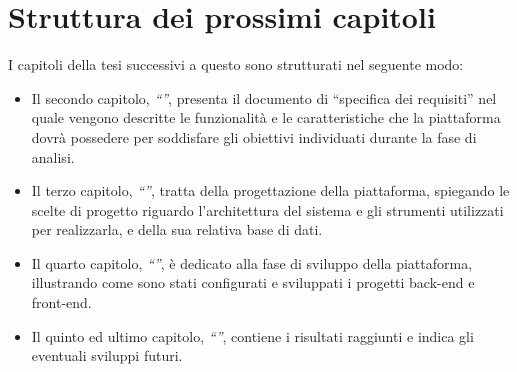 \section{Struttura dei prossimi capitoli}\label{sez:struttura_ dei_prossimi_capitoli}
I capitoli della tesi successivi a questo sono strutturati nel seguente modo:
\begin{itemize}
	\item Il secondo capitolo, \textit{``''}, presenta il documento di ``specifica dei requisiti'' nel quale vengono descritte le funzionalit\`a e le caratteristiche che la piattaforma dovr\`a possedere per soddisfare gli obiettivi individuati durante la fase di analisi.
	\item Il terzo capitolo, \textit{``''}, tratta della progettazione della piattaforma, spiegando le scelte di progetto riguardo l'architettura del sistema e gli strumenti utilizzati per realizzarla, e della sua relativa base di dati.
	\item Il quarto capitolo, \textit{``''}, \`e dedicato alla fase di sviluppo della piattaforma, illustrando come sono stati configurati e sviluppati i progetti back-end e front-end.
	\item Il quinto ed ultimo capitolo, \textit{``''}, contiene i risultati raggiunti e indica gli eventuali sviluppi futuri.
\end{itemize}











